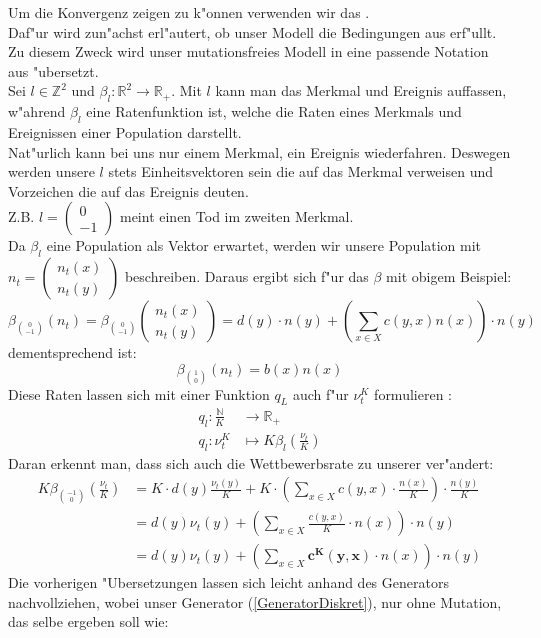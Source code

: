 \documentclass[11pt,a4paper]{article}
\theoremstyle{plain}
\newcommand{\tvec}[2]{\begin{pmatrix}#1\\#2\end{pmatrix}}
\begin{document}
Um die Konvergenz zeigen zu k"onnen verwenden wir das \cite[Kapitel 11, Thm 2.1]{ethier2009markov}. \\
Daf"ur wird zun"achst erl"autert, ob unser Modell die Bedingungen aus \cite{ethier2009markov} erf"ullt. Zu diesem Zweck wird unser mutationsfreies Modell in eine passende Notation aus \cite{ethier2009markov} "ubersetzt.\\
Sei $ l \in \mathbb{Z}^2 $ und $ \beta_l : \mathbb{R}^2 \to \mathbb{R}_+ $. Mit $ l $ kann man das Merkmal und Ereignis auffassen, w"ahrend $ \beta_l $ eine Ratenfunktion ist, welche die Raten eines Merkmals und Ereignissen einer Population darstellt.\\
Nat"urlich kann bei uns nur einem Merkmal, ein Ereignis wiederfahren. Deswegen werden unsere $ l $ stets Einheitsvektoren sein die auf das Merkmal verweisen und Vorzeichen die auf das Ereignis deuten.\\
Z.B. $ l = \tvec{0}{-1} $ meint einen Tod im zweiten Merkmal.\\
Da $ \beta_l $ eine Population als Vektor erwartet, werden wir unsere Population mit $ n_t = \tvec{n_t(x)}{n_t(y)} $ beschreiben. Daraus ergibt sich f"ur das $ \beta $ mit obigem Beispiel:
\[ \beta_{\binom{0}{-1}}(n_t)  = \beta_{\binom{0}{-1}}\tvec{n_t(x)}{n_t(y)} = d(y) \cdot n(y) + \left(\sum_{x \in X} c(y,x)n(x)\right) \cdot n(y) \]
dementsprechend ist:
\[ \beta_{\binom{1}{0}}(n_t)  = b(x)n(x) \]
Diese Raten lassen sich mit einer Funktion $ q_L $ auch f"ur $ \nu_t^K $ formulieren \cite[Kapitel 11 - (1.12)]{ethier2009markov}:
\begin{align*}
	q_l: \frac{\mathbb{N}}{K} &\longrightarrow \mathbb{R}_+\\
	q_l: \nu_t^K &\longmapsto K\beta_l\left(\frac{\nu_t}{K}\right)
\end{align*}
Daran erkennt man, dass sich auch die Wettbewerbsrate zu unserer ver"andert:
\begin{align*}
	K\beta_{\binom{-1}{0}}\left(\frac{\nu_t}{K}\right) &= K \cdot d(y)\frac{\nu_t(y)}{K} +  K \cdot \left(\sum_{x \in X} c(y,x) \cdot \frac{n(x)}{K}\right) \cdot \frac{n(y)}{K}\\
	&= d(y) \nu_t(y) + \left(\sum_{x \in X} \frac{c(y,x)}{K} \cdot n(x)\right) \cdot n(y)\\
	&= d(y) \nu_t(y) + \left(\sum_{x \in X} \bm{c^K(y,x)} \cdot n(x)\right) \cdot n(y)
\end{align*}
Die vorherigen "Ubersetzungen lassen sich leicht anhand des Generators nachvollziehen, wobei unser Generator (\ref{GeneratorDiskret}), nur ohne Mutation, das selbe ergeben soll wie: 
\end{document}
